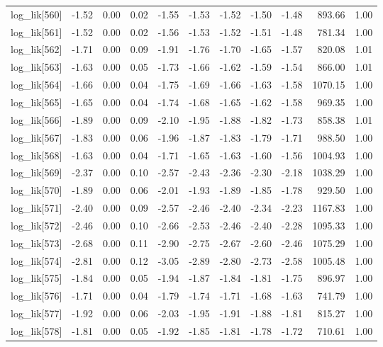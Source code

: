 \begin{table}[ht]
\begin{tabular}{rrrrrrrrrrr}
  log\_lik[560] & -1.52 & 0.00 & 0.02 & -1.55 & -1.53 & -1.52 & -1.50 & -1.48 & 893.66 & 1.00 \\ 
  log\_lik[561] & -1.52 & 0.00 & 0.02 & -1.56 & -1.53 & -1.52 & -1.51 & -1.48 & 781.34 & 1.00 \\ 
  log\_lik[562] & -1.71 & 0.00 & 0.09 & -1.91 & -1.76 & -1.70 & -1.65 & -1.57 & 820.08 & 1.01 \\ 
  log\_lik[563] & -1.63 & 0.00 & 0.05 & -1.73 & -1.66 & -1.62 & -1.59 & -1.54 & 866.00 & 1.01 \\ 
  log\_lik[564] & -1.66 & 0.00 & 0.04 & -1.75 & -1.69 & -1.66 & -1.63 & -1.58 & 1070.15 & 1.00 \\ 
  log\_lik[565] & -1.65 & 0.00 & 0.04 & -1.74 & -1.68 & -1.65 & -1.62 & -1.58 & 969.35 & 1.00 \\ 
  log\_lik[566] & -1.89 & 0.00 & 0.09 & -2.10 & -1.95 & -1.88 & -1.82 & -1.73 & 858.38 & 1.01 \\ 
  log\_lik[567] & -1.83 & 0.00 & 0.06 & -1.96 & -1.87 & -1.83 & -1.79 & -1.71 & 988.50 & 1.00 \\ 
  log\_lik[568] & -1.63 & 0.00 & 0.04 & -1.71 & -1.65 & -1.63 & -1.60 & -1.56 & 1004.93 & 1.00 \\ 
  log\_lik[569] & -2.37 & 0.00 & 0.10 & -2.57 & -2.43 & -2.36 & -2.30 & -2.18 & 1038.29 & 1.00 \\ 
  log\_lik[570] & -1.89 & 0.00 & 0.06 & -2.01 & -1.93 & -1.89 & -1.85 & -1.78 & 929.50 & 1.00 \\ 
  log\_lik[571] & -2.40 & 0.00 & 0.09 & -2.57 & -2.46 & -2.40 & -2.34 & -2.23 & 1167.83 & 1.00 \\ 
  log\_lik[572] & -2.46 & 0.00 & 0.10 & -2.66 & -2.53 & -2.46 & -2.40 & -2.28 & 1095.33 & 1.00 \\ 
  log\_lik[573] & -2.68 & 0.00 & 0.11 & -2.90 & -2.75 & -2.67 & -2.60 & -2.46 & 1075.29 & 1.00 \\ 
  log\_lik[574] & -2.81 & 0.00 & 0.12 & -3.05 & -2.89 & -2.80 & -2.73 & -2.58 & 1005.48 & 1.00 \\ 
  log\_lik[575] & -1.84 & 0.00 & 0.05 & -1.94 & -1.87 & -1.84 & -1.81 & -1.75 & 896.97 & 1.00 \\ 
  log\_lik[576] & -1.71 & 0.00 & 0.04 & -1.79 & -1.74 & -1.71 & -1.68 & -1.63 & 741.79 & 1.00 \\ 
  log\_lik[577] & -1.92 & 0.00 & 0.06 & -2.03 & -1.95 & -1.91 & -1.88 & -1.81 & 815.27 & 1.00 \\ 
  log\_lik[578] & -1.81 & 0.00 & 0.05 & -1.92 & -1.85 & -1.81 & -1.78 & -1.72 & 710.61 & 1.00 \\ 

\end{tabular}
\end{table}
